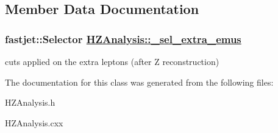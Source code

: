 \subsection{Member Data Documentation}
\hypertarget{classHZAnalysis_4ba1f2f659e07bda194f7eb8c6a2377c}{
\subsubsection[\_\-sel\_\-extra\_\-emus]{\setlength{\rightskip}{0pt plus 5cm}fastjet::Selector \hyperlink{classHZAnalysis_4ba1f2f659e07bda194f7eb8c6a2377c}{HZAnalysis::\_\-sel\_\-extra\_\-emus}}}
\label{classHZAnalysis_4ba1f2f659e07bda194f7eb8c6a2377c}


cuts applied on the extra leptons (after Z reconstruction) 

The documentation for this class was generated from the following files:\begin{CompactItemize}
\item 
HZAnalysis.h\item 
HZAnalysis.cxx\end{CompactItemize}
